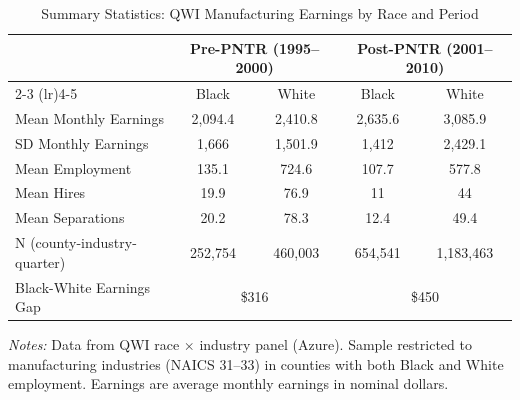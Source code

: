 \begin{table}[htbp]
\centering
\caption{Summary Statistics: QWI Manufacturing Earnings by Race and Period}
\label{tab:summary}
\small
\begin{tabular}{lcccc}
\toprule
 & \multicolumn{2}{c}{Pre-PNTR (1995--2000)} & \multicolumn{2}{c}{Post-PNTR (2001--2010)} \\
\cmidrule(lr){2-3} \cmidrule(lr){4-5}
 & Black & White & Black & White \\
\midrule
Mean Monthly Earnings & 2,094.4 & 2,410.8 & 2,635.6 & 3,085.9 \\
SD Monthly Earnings & 1,666 & 1,501.9 & 1,412 & 2,429.1 \\
Mean Employment & 135.1 & 724.6 & 107.7 & 577.8 \\
Mean Hires & 19.9 & 76.9 & 11 & 44 \\
Mean Separations & 20.2 & 78.3 & 12.4 & 49.4 \\
N (county-industry-quarter) & 252,754 & 460,003 & 654,541 & 1,183,463 \\
\midrule
Black-White Earnings Gap & \multicolumn{2}{c}{\$316} & \multicolumn{2}{c}{\$450} \\
\bottomrule
\end{tabular}
\begin{tablenotes}
\item \textit{Notes:} Data from QWI race $\times$ industry panel (Azure). Sample restricted to manufacturing industries (NAICS 31--33) in counties with both Black and White employment. Earnings are average monthly earnings in nominal dollars.
\end{tablenotes}
\end{table}
